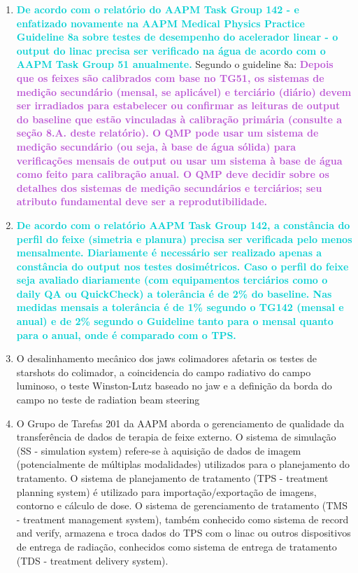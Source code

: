 \documentclass[11pt,a4paper]{article}
\begin{document}
\begin{enumerate}
        \item \textcolor{DarkTurquoise}{\textbf{De acordo com o relatório do AAPM Task Group 142 - e enfatizado novamente na AAPM Medical Physics Practice Guideline 8a sobre testes de desempenho do acelerador linear - o output do linac precisa ser verificado na água de acordo com o AAPM Task Group 51 anualmente.}} Segundo o guideline 8a: \textcolor{MediumOrchid}{\textbf{Depois que os feixes são calibrados com base no TG51, os sistemas de medição secundário (mensal, se aplicável) e terciário (diário) devem ser irradiados para estabelecer ou confirmar as leituras de output do baseline que estão vinculadas à calibração primária (consulte a seção 8.A. deste relatório). O QMP pode usar um sistema de medição secundário (ou seja, à base de água sólida) para verificações mensais de output ou usar um sistema à base de água como feito para calibração anual. O QMP deve decidir sobre os detalhes dos sistemas de medição secundários e terciários; seu atributo fundamental deve ser a reprodutibilidade.}}
        
        \item \textcolor{DarkTurquoise}{\textbf{De acordo com o relatório AAPM Task Group 142, a constância do perfil do feixe (simetria e planura) precisa ser verificada pelo menos mensalmente. Diariamente é necessário ser realizado apenas a constância do output nos testes dosimétricos. Caso o perfil do feixe seja avaliado diariamente (com equipamentos terciários como o daily QA ou QuickCheck) a tolerância é de 2\% do baseline. Nas medidas mensais a tolerância é de 1\% segundo o TG142  (mensal e anual) e de 2\% segundo o Guideline tanto para o mensal quanto para o anual, onde é comparado com o TPS.}}
        
        \item O desalinhamento mecânico dos jaws colimadores afetaria os testes de starshots do colimador, a coincidencia do campo radiativo do campo luminoso, o teste Winston-Lutz baseado no jaw e a definição da borda do campo no teste de radiation beam steering
        
        \item O Grupo de Tarefas 201 da AAPM aborda o gerenciamento de qualidade da transferência de dados de terapia de feixe externo. O sistema de simulação (SS - simulation system) refere-se à aquisição de dados de imagem (potencialmente de múltiplas modalidades) utilizados para o planejamento do tratamento. O sistema de planejamento de tratamento (TPS - treatment planning system) é utilizado para importação/exportação de imagens, contorno e cálculo de dose. O sistema de gerenciamento de tratamento (TMS - treatment management system), também conhecido como sistema de record and verify, armazena e troca dados do TPS com o linac ou outros dispositivos de entrega de radiação, conhecidos como sistema de entrega de tratamento (TDS - treatment delivery system).


\end{enumerate}
\end{document}
